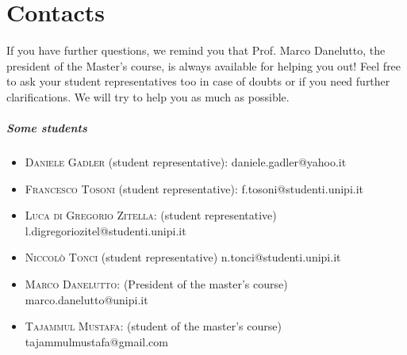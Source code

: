 \documentclass[11pt,fleqn,oneside]{book} %
\begin{document}

\chapter{Contacts}


If you have further questions, we remind you that Prof. Marco Danelutto, the president of the Master’s course, is always available for helping you out! Feel free to ask your student representatives too in case of doubts or if you need further clarifications. We will try to help you as much as possible. 

\paragraph{Some students}
\begin{itemize}
\item \textsc{Daniele Gadler} (student representative): daniele.gadler@yahoo.it
\item \textsc{Francesco Tosoni} (student representative): f.tosoni@studenti.unipi.it

\item \textsc{Luca di Gregorio Zitella}: (student representative) l.digregoriozitel@studenti.unipi.it


\item \textsc{Niccolò Tonci} (student representative) n.tonci@studenti.unipi.it




\item \textsc{Marco Danelutto}: (President of the master's course) marco.danelutto@unipi.it

\item \textsc{Tajammul Mustafa}: (student of the master's course)  tajammulmustafa@gmail.com



\end{itemize}
\end{document}
